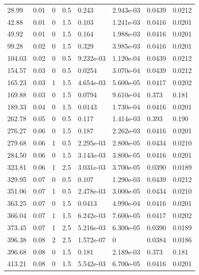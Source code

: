 \documentclass[preview]{standalone}
\begin{document}
{{\begin{tabular}{L{1.2cm}C{1.2cm} C{0.3cm}C{0.5cm} C{1.4cm}C{1.4cm} C{1.4cm}C{1.4cm}}
  28.99  &  0.01  & 0     & 0.5 &  0.243  & 2.943e-03  & 0.0439 &  0.0212   \\ 
  42.88  &  0.01  & 0     & 1.5 &  0.103  & 1.241e-03  & 0.0416 &  0.0201   \\ 
  49.92  &  0.01  & 0     & 1.5 &  0.164  & 1.988e-03  & 0.0416 &  0.0201   \\ 
  99.28  &  0.02  & 0     & 1.5 &  0.329  & 3.985e-03  & 0.0416 &  0.0201   \\ 
  104.03  &  0.02  & 0     & 0.5 &  9.232e-03  & 1.120e-04  & 0.0439 &  0.0212   \\ 
  154.57  &  0.03  & 0     & 0.5 &  0.0254  & 3.070e-04  & 0.0439 &  0.0212   \\ 
  165.23  &  0.03  & 1     & 1.5 &  4.654e-03  & 5.600e-05  & 0.0417 &  0.0202   \\ 
  169.88  &  0.03  & 0     & 1.5 &  0.0794  & 9.610e-04  & 0.373 &  0.181   \\ 
  189.33  &  0.04  & 0     & 1.5 &  0.0143  & 1.730e-04  & 0.0416 &  0.0201   \\ 
  262.78  &  0.05  & 0     & 0.5 &  0.117  & 1.414e-03  & 0.393 &  0.190   \\ 
  276.27  &  0.06  & 0     & 1.5 &  0.187  & 2.262e-03  & 0.0416 &  0.0201   \\ 
  279.68  &  0.06  & 1     & 0.5 &  2.295e-03  & 2.800e-05  & 0.0434 &  0.0210   \\ 
  284.50  &  0.06  & 0     & 1.5 &  3.143e-03  & 3.800e-05  & 0.0416 &  0.0201   \\ 
  323.81  &  0.06  & 1     & 2.5 &  3.031e-03  & 3.700e-05  & 0.0390 &  0.0189   \\ 
  329.95  &  0.07  & 0     & 0.5 &  0.107  & 1.290e-03  & 0.0439 &  0.0212   \\ 
  351.06  &  0.07  & 1     & 0.5 &  2.478e-03  & 3.000e-05  & 0.0434 &  0.0210   \\ 
  363.25  &  0.07  & 0     & 1.5 &  0.0413  & 4.990e-04  & 0.0416 &  0.0201   \\ 
  366.04  &  0.07  & 1     & 1.5 &  6.242e-03  & 7.600e-05  & 0.0417 &  0.0202   \\ 
  373.45  &  0.07  & 1     & 2.5 &  5.216e-03  & 6.300e-05  & 0.0390 &  0.0189   \\ 
  396.38  &  0.08  & 2     & 2.5 &  1.572e-07  & 0  & 0.0384 &  0.0186   \\ 
  396.68  &  0.08  & 0     & 1.5 &  0.181  & 2.189e-03  & 0.373 &  0.181   \\ 
  413.21  &  0.08  & 0     & 1.5 &  5.542e-03  & 6.700e-05  & 0.0416 &  0.0201   \\ 

\end{tabular}}}
\end{document}

